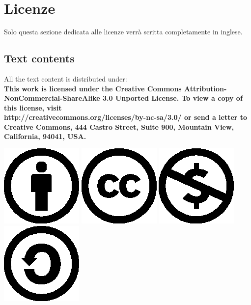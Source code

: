 \newpage

\section*{Licenze}

Solo questa sezione dedicata alle licenze verr\`a scritta completamente in
inglese.

\subsection*{Text contents}
All the text content is distributed under:\\
\textbf{
This work is licensed under the Creative Commons
Attribution-NonCommercial-ShareAlike 3.0 Unported License. To view a copy of 
this license, visit
\\http://creativecommons.org/licenses/by-nc-sa/3.0/  or send a
letter to Creative Commons, 444 Castro Street, Suite 900, Mountain View, 
California, 94041, USA.} 



\begin{center}
\includegraphics{cc-icons-eps/by}
\includegraphics{cc-icons-eps/cc}
\includegraphics{cc-icons-eps/nc}
\includegraphics{cc-icons-eps/sa}
\end{center}


